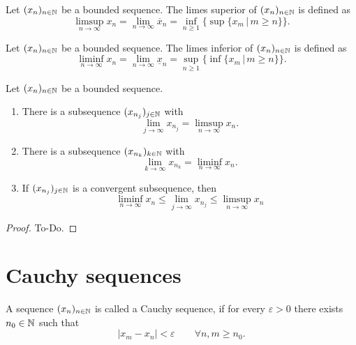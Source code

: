 \begin{definition}[Limsup]\label{def:limsup}
    Let $(x_n)_{n \in \mathbb{N}}$ be a bounded sequence.
    The limes superior of $(x_n)_{n \in \mathbb{N}}$ is defined as
    \[
    \limsup_{n \to \infty}{x_n} = \lim_{n \to \infty}\overline{x}_n = \inf_{n \geq 1}\{\sup{\{x_m\,|\, m \geq n\}}\}.
    \]
\end{definition}

\begin{definition}[Liminf]\label{def:liminf}
    Let $(x_n)_{n \in \mathbb{N}}$ be a bounded sequence.
    The limes inferior of $(x_n)_{n \in \mathbb{N}}$ is defined as
    \[
    \liminf_{n \to \infty}{x_n} = \lim_{n \to \infty}{\underline{x}_n} = \sup_{n \geq 1}{\{\inf{\{x_m\,|\, m \geq n\}}\}}.
    \]
\end{definition}

\begin{theorem}\label{thm:limsupliminfproperties}
    Let $(x_n)_{n \in \mathbb{N}}$ be a bounded sequence.
    \begin{enumerate}[label = \alph*)]
        \item There is a subsequence $(x_{n_j})_{j \in \mathbb{N}}$ with
        \[
        \lim_{j \to \infty}x_{n_j} = \limsup_{n \to \infty}{x_n}.
        \]
        \item There is a subsequence $(x_{n_k})_{k \in \mathbb{N}}$ with
        \[
        \lim_{k \to \infty}x_{n_k} = \liminf_{n \to \infty}{x_n}.
        \]
        \item If $(x_{n_j})_{j \in \mathbb{N}}$ is a convergent subsequence,
        then
        \[
        \liminf_{n \to \infty}{x_n} \leq \lim_{j \to \infty}{x_{n_j}} \leq \limsup_{n \to \infty}{x_n}
        \]
    \end{enumerate}
\end{theorem}
\begin{proof}
    To-Do.
\end{proof}

\section{Cauchy sequences}

\begin{definition}\label{def:cauchyseq}
    A sequence $(x_n)_{n \in \mathbb{N}}$ is called a Cauchy sequence,
    if for every $\varepsilon > 0$ there exists $n_0 \in \mathbb{N}$ such that
    \[
    |x_m - x_n| < \varepsilon\qquad\forall n, m \geq n_0.
    \]
\end{definition}

